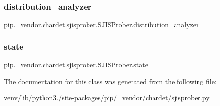 \subsubsection{\texorpdfstring{distribution\+\_\+analyzer}{distribution\_analyzer}}
{\footnotesize\ttfamily pip.\+\_\+vendor.\+chardet.\+sjisprober.\+S\+J\+I\+S\+Prober.\+distribution\+\_\+analyzer}

\mbox{\label{classpip_1_1__vendor_1_1chardet_1_1sjisprober_1_1SJISProber_a77f5cad65f5976df790b72b749ca97fc}} 
\subsubsection{\texorpdfstring{state}{state}}
{\footnotesize\ttfamily pip.\+\_\+vendor.\+chardet.\+sjisprober.\+S\+J\+I\+S\+Prober.\+state}



The documentation for this class was generated from the following file\+:\begin{DoxyCompactItemize}
\item 
venv/lib/python3./site-\/packages/pip/\+\_\+vendor/chardet/\hyperlink{sjisprober_8py}{sjisprober.\+py}\end{DoxyCompactItemize}
